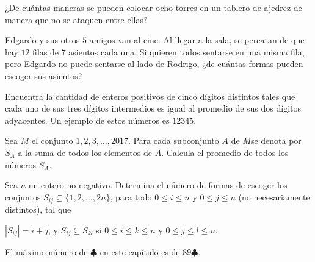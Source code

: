 \begin{problem}[$3 \clubsuit$]
    ¿De cuántas maneras se pueden colocar ocho torres en un tablero de 
    ajedrez de manera que no se ataquen entre ellas?
\end{problem}

\begin{problem}[$4 \clubsuit$]
    Edgardo y sus otros $5$ amigos van al cine. Al llegar a la sala, 
    se percatan de que hay $12$ filas de $7$ asientos cada una. Si quieren 
    todos sentarse en una misma fila, pero Edgardo no puede sentarse al 
    lado de Rodrigo, ¿de cuántas formas pueden escoger sus asientos?
\end{problem}

\begin{problem}
    Encuentra la cantidad de enteros positivos de cinco dígitos 
    distintos tales que cada uno de sus tres dígitos intermedios 
    es igual al promedio de sus dos dígitos adyacentes. 
    Un ejemplo de estos números es \(12345\).
\end{problem}

\begin{problem}
    Sea $M$ el conjunto \(1, 2, 3, \ldots , 2017\). Para cada 
    subconjunto $A$ de $M $se denota por $S_A$ a la suma de 
    todos los elementos de $A$. Calcula el promedio de todos 
    los números $S_A$.
\end{problem}

\begin{problem}
    \jp

    Sea $n$ un entero no negativo.
    Determina el número de formas de escoger los conjuntos
    $S_{ij} \subseteq \{1, 2, \dots, 2n\}$,
    para todo $0 \le i \le n$ y $0 \le j \le n$
    (no necesariamente distintos), tal que
    \begin{itemize}
    \ii $|S_{ij}| = i+j$, y
    \ii $S_{ij} \subseteq S_{kl}$ si $0 \le i \le k \le n$
    y $0 \le j \le l \le n$.
    \end{itemize}
\end{problem}

\noindent El máximo número de $\clubsuit$ en este capítulo es de 
$89 \clubsuit$.
